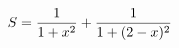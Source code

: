 \documentclass[preview]{standalone}
\begin{document}
\begin{align*}
\special{dvisvgm:raw <g id='unique000'>}S=\frac{1}{1+x^2}+\frac{1}{1+(2-x)^2}\special{dvisvgm:raw </g>}
\end{align*}
\end{document}

